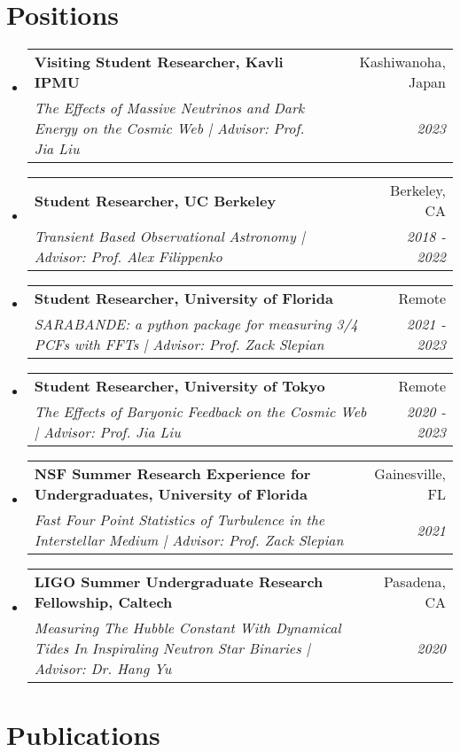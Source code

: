 \documentclass[letterpaper,10pt]{article}
\makeatletter
\newcommand{\resumeSubheading}[4]{
  \vspace{-1pt}\item[]
  \begin{tabular*}{0.98\textwidth}{l@{\extracolsep{\fill}}r}
      \hspace{-10pt}\textbf{#1} & #2 \\
      \hspace{-10pt}\textit{\small#3} & \textit{\small #4} \\
    \end{tabular*}\vspace{-3pt}
}
\newcommand{\resumeSubHeadingListStart}{\begin{itemize}[leftmargin=*]}
\newcommand{\resumeSubHeadingListEnd}{\end{itemize}}
\newcommand{\shorterSection}[1]{\vspace{-10pt}\section{#1}}
\newcommand{\shortershorterSection}[1]{\vspace{-10pt}\subsection{#1}}
\makeatother
\begin{document}
\vspace{5pt}

\shorterSection{Positions}
  \resumeSubHeadingListStart
  \resumeSubheading
      {Visiting Student Researcher, Kavli IPMU}{Kashiwanoha, Japan}{The Effects of Massive Neutrinos and Dark Energy on the Cosmic Web | Advisor: Prof. Jia Liu}{2023}{
    }
    \resumeSubheading
      {Student Researcher, UC Berkeley}{Berkeley, CA}{Transient Based Observational Astronomy | Advisor: Prof. Alex Filippenko}{2018 - 2022}{
    }
    \resumeSubheading
      {Student Researcher, University of Florida}{Remote}{SARABANDE: a python package for measuring 3/4 PCFs with FFTs | Advisor: Prof. Zack Slepian}{2021 - 2023}{
    }
    \resumeSubheading
      {Student Researcher, University of Tokyo}{Remote}{The Effects of Baryonic Feedback on the Cosmic Web | Advisor: Prof. Jia Liu}{2020 - 2023}{
    }
    \resumeSubheading
      {NSF Summer Research Experience for Undergraduates, University of Florida}{Gainesville, FL}{Fast Four Point Statistics of Turbulence in the Interstellar Medium | Advisor: Prof. Zack Slepian}{2021}{
    }
    \resumeSubheading
      {LIGO Summer Undergraduate Research Fellowship, Caltech}{Pasadena, CA}
      {Measuring The Hubble Constant With Dynamical Tides In Inspiraling Neutron Star Binaries | Advisor: Dr. Hang Yu}{2020}{
    }

  \resumeSubHeadingListEnd


\shorterSection{Publications}
% 
\vspace{4pt}
\small
\begin{enumerate}
% 


\end{enumerate}

% 
\end{document}
